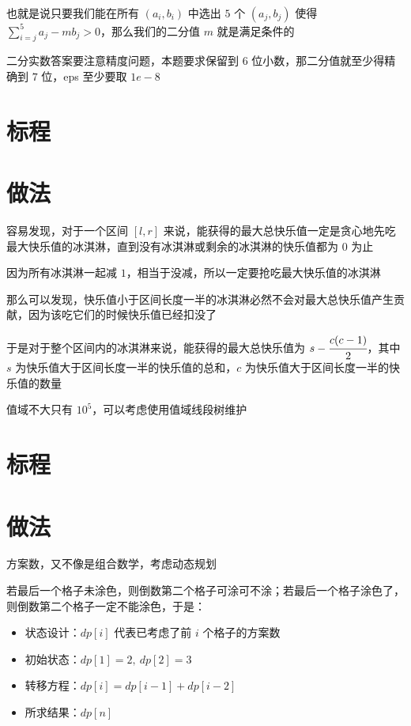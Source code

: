 \documentclass{ctsol}
\begin{document}
也就是说只要我们能在所有 $(a_i,b_i)$ 中选出 $5$ 个 $(a_j,b_j)$ 使得 $\sum_{i=j}^{5}a_j-mb_j > 0$，那么我们的二分值 $m$ 就是满足条件的

二分实数答案要注意精度问题，本题要求保留到 $6$ 位小数，那二分值就至少得精确到 $7$ 位，eps 至少要取 $1e-8$

\section*{标程}


\makesolution
\section*{做法}

容易发现，对于一个区间 $[l,r]$ 来说，能获得的最大总快乐值一定是贪心地先吃最大快乐值的冰淇淋，直到没有冰淇淋或剩余的冰淇淋的快乐值都为 $0$ 为止

因为所有冰淇淋一起减 $1$，相当于没减，所以一定要抢吃最大快乐值的冰淇淋

那么可以发现，快乐值小于区间长度一半的冰淇淋必然不会对最大总快乐值产生贡献，因为该吃它们的时候快乐值已经扣没了

于是对于整个区间内的冰淇淋来说，能获得的最大总快乐值为 $s-\cfrac{c(c-1)}{2}$，其中 $s$ 为快乐值大于区间长度一半的快乐值的总和，$c$ 为快乐值大于区间长度一半的快乐值的数量

值域不大只有 ${10}^5$，可以考虑使用值域线段树维护

\section*{标程}


\makesolution
\section*{做法}

方案数，又不像是组合数学，考虑动态规划

若最后一个格子未涂色，则倒数第二个格子可涂可不涂；若最后一个格子涂色了，则倒数第二个格子一定不能涂色，于是：

\begin{itemize}
    \item 状态设计：$dp[i]$ 代表已考虑了前 $i$ 个格子的方案数
    \item 初始状态：$dp[1] = 2,~dp[2] = 3$
    \item 转移方程：$dp[i] = dp[i-1] + dp[i-2]$
    \item 所求结果：$dp[n]$
\end{itemize}
\end{document}
